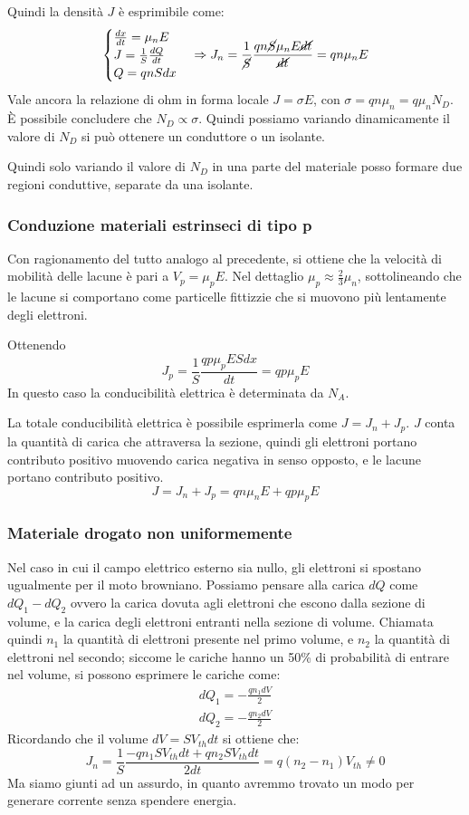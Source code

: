 \documentclass[../template]{subfiles}
\begin{document}
Quindi la densità $J$ è esprimibile come:
\[
    \begin{cases}
        \frac{dx}{dt} = \mu_n E
        \\
        J = \frac{1}{S} \frac{dQ}{dt}
        \\
        Q = qnS dx
    \end{cases}
    \Rightarrow
    J_n = \frac{1}{\cancel{S}} \frac{qn\cancel{S} \mu_n E \cancel{dt}}{\cancel{dt}} = qn\mu_n E
\]
Vale ancora la relazione di ohm in forma locale $J = \sigma E$, con $\sigma = qn \mu_n = q \mu_n N_D$.
È possibile concludere che $N_D \propto \sigma$. Quindi possiamo variando dinamicamente il valore di $N_D$ si può ottenere un conduttore o un isolante.

Quindi solo variando il valore di $N_D$ in una parte del materiale posso formare due regioni conduttive, separate da una isolante.

\subsubsection{Conduzione materiali estrinseci di tipo p}
Con ragionamento del tutto analogo al precedente, si ottiene che la velocità di mobilità delle lacune è pari a $V_p = \mu_p E$.
Nel dettaglio $\mu_p \approx \frac{2}{3} \mu_n$, sottolineando che le lacune si comportano come particelle fittizzie che si muovono più lentamente degli elettroni.

Ottenendo
\[
    J_p = \frac{1}{S}\frac{qp\mu_pESdx}{dt} = qp\mu_p E
\]
In questo caso la conducibilità elettrica è determinata da $N_A$.

La totale conducibilità elettrica è possibile esprimerla come $J = J_n + J_p$. $J$ conta la quantità di carica che attraversa la sezione, quindi gli elettroni portano contributo positivo muovendo carica negativa in senso opposto, e le lacune portano contributo positivo.
\[
    J = J_n + J_p = qn\mu_n E + qp \mu_p E
\]
\subsubsection{Materiale drogato non uniformemente}

Nel caso in cui il campo elettrico esterno sia nullo, gli elettroni si spostano ugualmente per il moto browniano.
Possiamo pensare alla carica $dQ$ come $dQ_1 - dQ_2$ ovvero la carica dovuta agli elettroni che escono dalla sezione di volume, e la carica degli elettroni entranti nella sezione di volume.
Chiamata quindi $n_1$ la quantità di elettroni presente nel primo volume, e $n_2$ la quantità di elettroni nel secondo; siccome le cariche hanno un 50\% di probabilità di entrare nel volume, si possono esprimere le cariche come:
\begin{align*}
    dQ_1 = -\frac{q n_1 dV}{2}\\
    dQ_2 = -\frac{q n_2 dV}{2}
\end{align*}
Ricordando che il volume $dV = S V_{th} dt$ si ottiene che:
\[
    J_n = \frac{1}{S} \frac{-qn_1 S V_{th} dt + qn_2 S V_{th} dt}{2dt}  = q(n_2 - n_1) V_{th} \neq 0
\]
Ma siamo giunti ad un assurdo, in quanto avremmo trovato un modo per generare corrente senza spendere energia.
\end{document}

